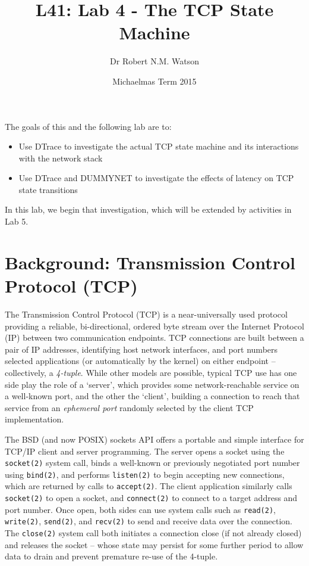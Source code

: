 \documentclass[a4paper,10pt]{article}
\begin{document}
\title{L41: Lab 4 - The TCP State Machine}
\author{Dr Robert N.M. Watson}
\date{Michaelmas Term 2015}
\maketitle

\noindent
The goals of this and the following lab are to:

\begin{itemize}
\item Use DTrace to investigate the actual TCP state machine and its
  interactions with the network stack
\item Use DTrace and DUMMYNET to investigate the effects of latency on TCP
  state transitions
\end{itemize}

\noindent
In this lab, we begin that investigation, which will be extended by activities
in Lab 5.

\section*{Background: Transmission Control Protocol (TCP)}

The Transmission Control Protocol (TCP) is a near-universally used protocol
providing a reliable, bi-directional, ordered byte stream over the Internet
Protocol (IP) between two communication endpoints.
TCP connections are built between a pair of IP addresses, identifying host
network interfaces, and port numbers selected applications (or automatically
by the kernel) on either endpoint -- collectively, a \textit{4-tuple}.
While other models are possible, typical TCP use has one side play the role of
a `server', which provides some network-reachable service on a well-known
port, and the other the `client', building a connection to reach that service
from an \textit{ephemeral port} randomly selected by the client TCP
implementation.

The BSD (and now POSIX) sockets API offers a portable and simple interface for
TCP/IP client and server programming.
The server opens a socket using the \texttt{socket(2)} system call, binds a
well-known or previously negotiated port number using \texttt{bind(2)}, and
performs \texttt{listen(2)} to begin accepting new connections, which are
returned by calls to \texttt{accept(2)}.
The client application similarly calls \texttt{socket(2)} to open a socket,
and \texttt{connect(2)} to connect to a target address and port number.
Once open, both sides can use system calls such as \texttt{read(2)},
\texttt{write(2)}, \texttt{send(2)}, and \texttt{recv(2)} to send and receive
data over the connection.
The \texttt{close(2)} system call both initiates a connection close (if not
already closed) and releases the socket -- whose state may persist for some
further period to allow data to drain and prevent premature re-use of the
4-tuple.
\end{document}

